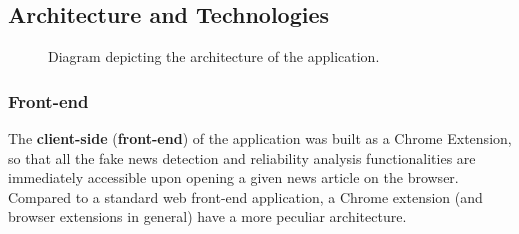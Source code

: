 \subsection{Architecture and Technologies}

\begin{figure}[h]
  \centering
  \caption{Diagram depicting the architecture of the application.}
\end{figure}
  
\subsubsection{Front-end}
  The \textbf{client-side} (\textbf{front-end}) of the application was built as a Chrome Extension, so that all the fake news detection and reliability analysis functionalities are immediately accessible upon opening a given news article on the browser. Compared to a standard web front-end application, a Chrome extension (and browser extensions in general) have a more peculiar architecture. 

